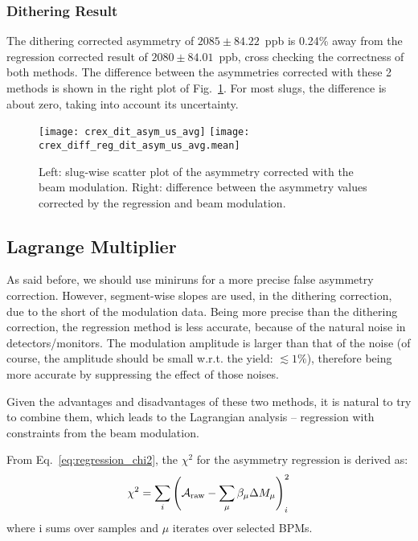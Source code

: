 \subsubsection{Dithering Result}
The dithering corrected asymmetry of $2085 \pm 84.22$~ppb is 0.24\% away from
the regression corrected result of $2080 \pm 84.01$~ppb, cross checking the correctness
of both methods. The difference between the asymmetries corrected with these 2 methods
is shown in the right plot of Fig.~\ref{fig:dit_result}. For most slugs, the difference
is about zero, taking into account its uncertainty.
\begin{figure}[H]
    \centering
    \texttt{[image: crex\_dit\_asym\_us\_avg]}
    \texttt{[image: crex\_diff\_reg\_dit\_asym\_us\_avg.mean]}
    \caption{Left: slug-wise scatter plot of the asymmetry corrected with the beam modulation.
    Right: difference between the asymmetry values corrected by the regression and
    beam modulation.}
    \label{fig:dit_result}
\end{figure}


\subsection{Lagrange Multiplier}
As said before, we should use miniruns for a more precise false asymmetry correction.
However, segment-wise slopes are used, in the dithering correction, due to the short of the
modulation data. Being more precise than the dithering correction, the regression method is 
less accurate, because of the natural noise in detectors/monitors. 
The modulation amplitude is larger than that of the noise (of course, the amplitude
should be small w.r.t. the yield: $\lesssim 1\%$), therefore being
more accurate by suppressing the effect of those noises.

Given the advantages and disadvantages of these two methods, it is natural to 
try to combine them, which leads to the Lagrangian analysis -- regression
with constraints from the beam modulation.

From Eq.~\ref{eq:regression_chi2}, the $\chi^2$ for the asymmetry regression is
derived as:
\begin{equation}
    \chi^2 = \sum_i \left( \mathcal{A}_{\text{raw}} - \sum_\mu \beta_\mu \Delta M_\mu \right)_i^2
\end{equation}
where i sums over samples and $\mu$ iterates over selected BPMs.

